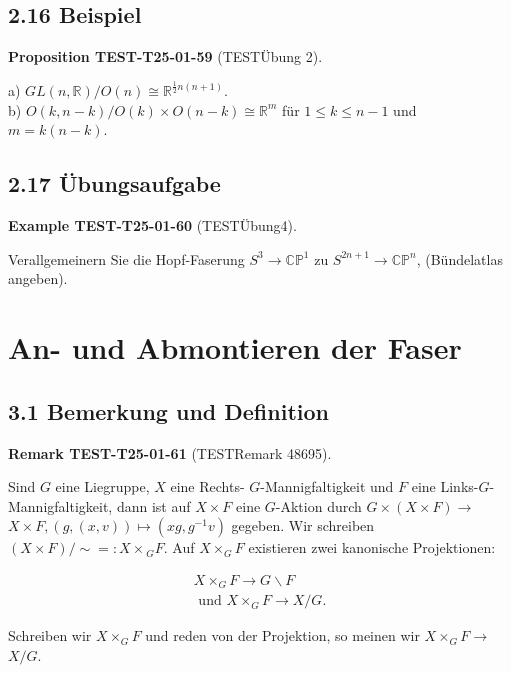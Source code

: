 \documentclass[10pt, letterpaper]{article}
\newcommand{\CustomHeading}[3]{%
  \par\medskip\noindent%
  \textbf{#1 #2} \textnormal{(#3)}.\enskip%
}
\newenvironment{PROP}[2]{\begin{unitbox}\CustomHeading{Proposition}{#1}{#2}}{\end{unitbox}}
\newenvironment{REM}[2]{\begin{unitbox}\CustomHeading{Remark}{#1}{#2}}{\end{unitbox}}
\newenvironment{EXA}[2]{\begin{unitbox}\CustomHeading{Example}{#1}{#2}}{\end{unitbox}}
\begin{document}
\subsection*{2.16 Beispiel}
\begin{PROP}{TEST-T25-01-59}{TESTÜbung 2}
a) $G L(n, \mathbb{R}) / O(n) \cong \mathbb{R}^{\frac{1}{2} n(n+1)}$.\\
b) $O(k, n-k) / O(k) \times O(n-k) \cong \mathbb{R}^{m}$ für $1 \leq k \leq n-1$ und $m=k(n-k)$.
\end{PROP}

\subsection*{2.17 Übungsaufgabe}
\begin{EXA}{TEST-T25-01-60}{TESTÜbung4}
Verallgemeinern Sie die Hopf-Faserung $S^{3} \rightarrow \mathbb{C P}^{1}$ zu $S^{2 n+1} \rightarrow \mathbb{C} \mathbb{P}^{n}$, (Bündelatlas angeben).
\end{EXA}


\pagebreak

\section{An- und Abmontieren der Faser}

\subsection*{3.1 Bemerkung und Definition}
\begin{REM}{TEST-T25-01-61}{TESTRemark 48695}
Sind $G$ eine Liegruppe, $X$ eine Rechts- $G$-Mannigfaltigkeit und $F$ eine Links-$G$-Mannigfaltigkeit, dann ist auf $X \times F$ eine $G$-Aktion durch $G \times(X \times F) \rightarrow$ $X \times F,(g,(x, v)) \mapsto\left(x g, g^{-1} v\right)$ gegeben. Wir schreiben $(X \times F) / \sim=: X \times{ }_{G} F$. Auf $X \times_{G} F$ existieren zwei kanonische Projektionen:

$$
\begin{gathered}
X \times_{G} F \rightarrow G \backslash F \\
\text { und } X \times_{G} F \rightarrow X / G .
\end{gathered}
$$

Schreiben wir $X \times_{G} F$ und reden von der Projektion, so meinen wir $X \times_{G} F \rightarrow$ $X / G$.
\end{REM}
\end{document}
